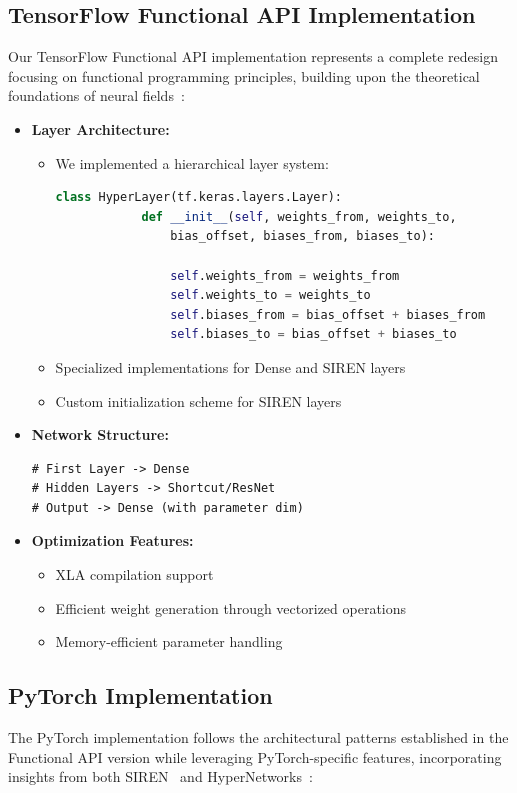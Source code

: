 \documentclass[10pt,journal,compsoc,onecolumn]{IEEEtran}
\begin{document}
\subsection{TensorFlow Functional API Implementation}
Our TensorFlow Functional API implementation represents a complete redesign focusing on functional programming principles, building upon the theoretical foundations of neural fields~\cite{neural_fields2022}:
\begin{itemize}
    \item \textbf{Layer Architecture:}
    \begin{itemize}
        \item  We implemented a hierarchical layer system:
        \begin{lstlisting}[language=Python, gobble=8]
        class HyperLayer(tf.keras.layers.Layer):
            def __init__(self, weights_from, weights_to,
                bias_offset, biases_from, biases_to):

                self.weights_from = weights_from
                self.weights_to = weights_to
                self.biases_from = bias_offset + biases_from
                self.biases_to = bias_offset + biases_to
        \end{lstlisting}
        \item Specialized implementations for Dense and SIREN layers
        \item Custom initialization scheme for SIREN layers
    \end{itemize}

    \item \textbf{Network Structure:}
    \begin{verbatim}
# First Layer -> Dense
# Hidden Layers -> Shortcut/ResNet
# Output -> Dense (with parameter dim)
    \end{verbatim}

    \item \textbf{Optimization Features:}
    \begin{itemize}
        \item XLA compilation support
        \item Efficient weight generation through vectorized operations
        \item Memory-efficient parameter handling
    \end{itemize}
\end{itemize}

\subsection{PyTorch Implementation}
The PyTorch implementation follows the architectural patterns established in the Functional API version while leveraging PyTorch-specific features, incorporating insights from both SIREN~\cite{siren2020} and HyperNetworks~\cite{hypernetworks2016}:
\end{document}
